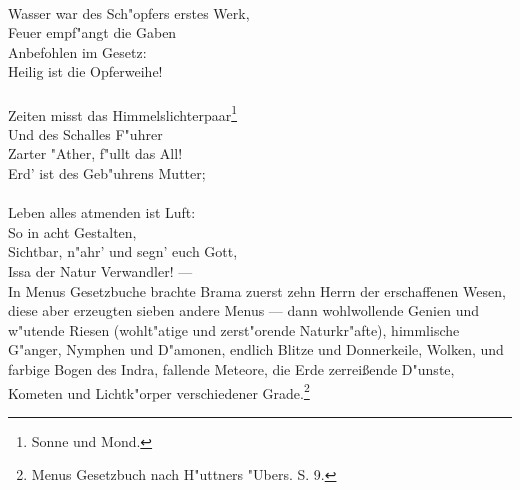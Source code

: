 \documentclass[a4paper, 11pt, oneside, polutonikogreek, german]{article}
\begin{document}
\\
Wasser war des Sch"opfers erstes Werk,\\
Feuer empf"angt die Gaben\\
Anbefohlen im Gesetz:\\
Heilig ist die Opferweihe!\\
\\
\hspace*{1cm} Zeiten misst das Himmelslichterpaar\footnote{Sonne und Mond.}\\
\hspace*{1cm} Und des Schalles F"uhrer\\
\hspace*{1cm} Zarter "Ather, f"ullt das All!\\
\hspace*{1cm} Erd' ist des Geb"uhrens Mutter;\\
\\
\hspace*{2cm} Leben alles atmenden ist Luft:\\
\hspace*{2cm} So in acht Gestalten,\\
\hspace*{2cm} Sichtbar, n"ahr' und segn' euch Gott,\\
\hspace*{2cm} Issa der Natur Verwandler! ---\\

In Menus Gesetzbuche brachte Brama zuerst zehn Herrn der erschaffenen Wesen, diese aber erzeugten sieben andere Menus --- dann wohlwollende Genien und w"utende Riesen (wohlt"atige und zerst"orende Naturkr"afte), himmlische G"anger, Nymphen und D"amonen, endlich Blitze und Donnerkeile, Wolken, und farbige Bogen des Indra, fallende Meteore, die Erde zerreißende D"unste, Kometen und Lichtk"orper verschiedener Grade.\footnote{Menus Gesetzbuch nach H"uttners "Ubers. S. 9.}
\end{document}
